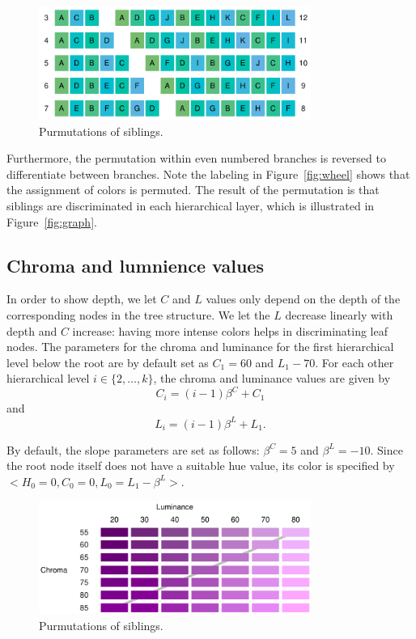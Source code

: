 \documentclass[journal]{vgtc}                %
\begin{document}
\begin{figure}[htb]
  \centering
  \includegraphics[width=3.5in]{Permutations.pdf}
  \caption{Purmutations of siblings.}\label{fig:perm}
\end{figure}

Furthermore, the permutation within even numbered branches is reversed to differentiate between branches. Note the labeling in Figure~\ref{fig:wheel} shows that the assignment of colors is permuted. The result of the permutation is that siblings are discriminated in each hierarchical layer, which is illustrated in Figure~\ref{fig:graph}.


\subsection{Chroma and lumnience values}

In order to show depth, we let $C$ and $L$ values only depend on the depth of the corresponding nodes in the tree structure. We let the $L$ decrease linearly with depth and $C$ increase: having more intense colors helps in discriminating leaf nodes. The parameters for the chroma and luminance for the first hierarchical level below the root are by default set as $C_1=60$ and $L_1-70$. For each other hierarchical level $i \in \{2, \ldots, k\}$, the chroma and luminance values are given by
\begin{equation}
C_i=(i-1)\beta^C + C_1
\end{equation}
and
\begin{equation}
L_i=(i-1)\beta^L + L_1.
\end{equation}

By default, the slope parameters are set as follows: $\beta^C=5$ and $\beta^L=-10$. Since the root node itself does not have a suitable hue value, its color is specified by $<H_0=0, C_0=0, L_0=L_1-\beta^L>$.

\begin{figure}[htb]
  \centering
  \includegraphics[width=3.5in]{LC.pdf}
  \caption{Purmutations of siblings.}\label{fig:lc}
\end{figure}
\end{document}
